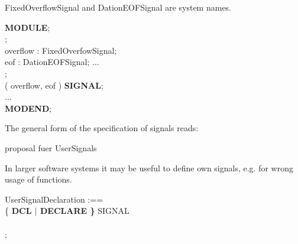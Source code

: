 FixedOverflowSignal and DationEOFSignal are system names.

{\bf MODULE};\\
;\\
\x \x overflow : FixedOverfowSignal;\\
\x \x eof : DationEOFSignal;
\x \x ...\\
;\\
\x {} ( overflow, eof ) {\bf SIGNAL};\\
\x \x ... \\
{\bf MODEND};

The general form of the specification of signals reads:



\begin{discuss}

proposal fuer UserSignals

In larger software systems it may be useful to define own signals, e.g.
for wrong usage of functions. 

UserSignalDeclaration :==\\
\x \{ {\bf DCL $\mid$ DECLARE \} }  SIGNAL\\
\x {} \\
\x {} ;

\end{discuss}

